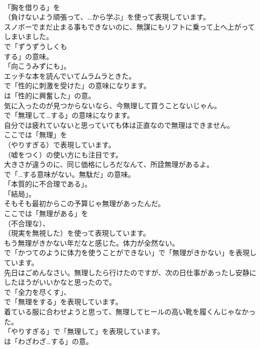 \documentclass[8pt]{extreport}
\begin{document}
\begin{CJK}{UTF8}{min}
\\	「胸を借りる」を 
\\	（負けないよう頑張って、…から学ぶ」を使って表現しています。	
\\	スノボーでまだ止まる事もできないのに、無謀にもリフトに乗って上へ上がってしまいました。 
\\	で「ずうずうしくも 
\\	する」の意味。
\\	「向こうみずにも」。	
\\	エッチな本を読んでいてムラムラときた。 
\\	で「性的に刺激を受けた」の意味になります。
\\	は「性的に興奮した」の意。	
\\	気に入ったのが見つからないなら、今無理して買うことないじゃん。 
\\	で「無理して…する」の意味になります。	
\\	自分では疲れていないと思っていても体は正直なので無理はできません。 
\\	ここでは「無理」を 
\\	（やりすぎる）で表現しています。
\\	（嘘をつく）の使い方にも注目です。	
\\	大きさが違うのに、同じ価格にしろだなんて、所詮無理があるよ。 
\\	で「…する意味がない。無駄だ」の意味。
\\	「本質的に不合理である」。
\\	「結局」。	
\\	そもそも最初からこの予算じゃ無理があったんだ。 
\\	ここでは「無理がある」を 
\\	（不合理な）、
\\	（現実を無視した）を使って表現しています。	
\\	もう無理がきかない年だなと感じた。体力が全然ない。 
\\	で「かつてのように体力を使うことができない」で「無理がきかない」を表現しています。	
\\	先日はごめんなさい。無理したら行けたのですが、次の日仕事があったし安静にしたほうがいいかなと思ったので。 
\\	で「全力を尽くす」、
\\	で「無理をする」を表現しています。	
\\	着ている服に合わせようと思って、無理してヒールの高い靴を履くんじゃなかった。 
\\	「やりすぎる」で「無理して」を表現しています。
\\	は「わざわざ…する」の意。	

\end{CJK}
\end{document}
